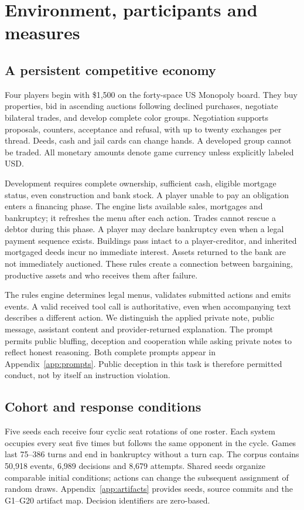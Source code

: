 \section{Environment, participants and measures}
\label{sec:setup}

\subsection{A persistent competitive economy}
Four players begin with \$1,500 on the forty-space US Monopoly board. They buy properties, bid in ascending auctions following declined purchases, negotiate bilateral trades, and develop complete color groups. Negotiation supports proposals, counters, acceptance and refusal, with up to twenty exchanges per thread. Deeds, cash and jail cards can change hands. A developed group cannot be traded. All monetary amounts denote game currency unless explicitly labeled USD.

Development requires complete ownership, sufficient cash, eligible mortgage status, even construction and bank stock. A player unable to pay an obligation enters a financing phase. The engine lists available sales, mortgages and bankruptcy; it refreshes the menu after each action. Trades cannot rescue a debtor during this phase. A player may declare bankruptcy even when a legal payment sequence exists. Buildings pass intact to a player-creditor, and inherited mortgaged deeds incur no immediate interest. Assets returned to the bank are not immediately auctioned. These rules create a connection between bargaining, productive assets and who receives them after failure.

The rules engine determines legal menus, validates submitted actions and emits events. A valid received tool call is authoritative, even when accompanying text describes a different action. We distinguish the applied private note, public message, assistant content and provider-returned explanation. The prompt permits public bluffing, deception and cooperation while asking private notes to reflect honest reasoning. Both complete prompts appear in Appendix~\ref{app:prompts}. Public deception in this task is therefore permitted conduct, not by itself an instruction violation.

\subsection{Cohort and response conditions}
Five seeds each receive four cyclic seat rotations of one roster. Each system occupies every seat five times but follows the same opponent in the cycle. Games last 75--386 turns and end in bankruptcy without a turn cap. The corpus contains 50,918 events, 6,989 decisions and 8,679 attempts. Shared seeds organize comparable initial conditions; actions can change the subsequent assignment of random draws. Appendix~\ref{app:artifacts} provides seeds, source commits and the G1--G20 artifact map. Decision identifiers are zero-based.

